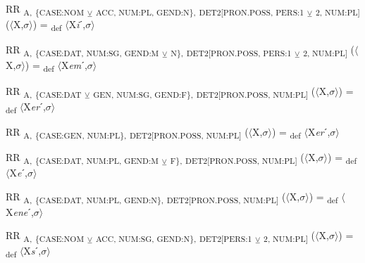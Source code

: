 {\begin{exe}
 RR \textsubscript{A,} \textsubscript{\{CASE:NOM} \textsubscript{${\veebar}$}\textsubscript{ ACC, NUM:PL, GEND:N\},} \textsubscript{DET2[PRON.POSS, PERS:1} \textsubscript{${\veebar}$}\textsubscript{ 2, NUM:PL]}  ($\langle$X,$\sigma $$\rangle$) = \textsubscript{def} $\langle$X\textit{i}ˊ,$\sigma $$\rangle$
\end{exe}

\begin{exe}
 RR \textsubscript{A,} \textsubscript{\{CASE:DAT, NUM:SG, GEND:M} \textsubscript{${\veebar}$}\textsubscript{ N\},} \textsubscript{DET2[PRON.POSS, PERS:1} \textsubscript{${\veebar}$}\textsubscript{ 2, NUM:PL]}  ($\langle$X,$\sigma $$\rangle$) = \textsubscript{def} $\langle$X\textit{em}ˊ,$\sigma $$\rangle$
\end{exe}

\begin{exe}
 RR \textsubscript{A,} \textsubscript{\{CASE:DAT} \textsubscript{${\veebar}$}\textsubscript{ GEN, NUM:SG, GEND:F\},} \textsubscript{DET2[PRON.POSS, NUM:PL]}  ($\langle$X,$\sigma $$\rangle$) = \textsubscript{def} $\langle$X\textit{er}ˊ,$\sigma $$\rangle$
\end{exe}

\begin{exe}
 RR \textsubscript{A,} \textsubscript{\{CASE:GEN, NUM:PL\},} \textsubscript{DET2[PRON.POSS, NUM:PL]}  ($\langle$X,$\sigma $$\rangle$) = \textsubscript{def} $\langle$X\textit{er}ˊ,$\sigma $$\rangle$
\end{exe}

\begin{exe}
 RR \textsubscript{A,} \textsubscript{\{CASE:DAT, NUM:PL, GEND:M} \textsubscript{${\veebar}$}\textsubscript{ F\},} \textsubscript{DET2[PRON.POSS, NUM:PL]}  ($\langle$X,$\sigma $$\rangle$) = \textsubscript{def} $\langle$X\textit{e}ˊ,$\sigma $$\rangle$
\end{exe}

\begin{exe}
 RR \textsubscript{A,} \textsubscript{\{CASE:DAT, NUM:PL, GEND:N\},} \textsubscript{DET2[PRON.POSS, NUM:PL]}  ($\langle$X,$\sigma $$\rangle$) = \textsubscript{def} $\langle$X\textit{ene}ˊ,$\sigma $$\rangle$
\end{exe}

\begin{exe}
 RR \textsubscript{A,} \textsubscript{\{CASE:NOM} \textsubscript{${\veebar}$}\textsubscript{ ACC, NUM:SG, GEND:N\},} \textsubscript{DET2[PERS:1} \textsubscript{${\veebar}$}\textsubscript{ 2, NUM:PL]}  ($\langle$X,$\sigma $$\rangle$) = \textsubscript{def} $\langle$X\textit{s}ˊ,$\sigma $$\rangle$
\end{exe}

}
